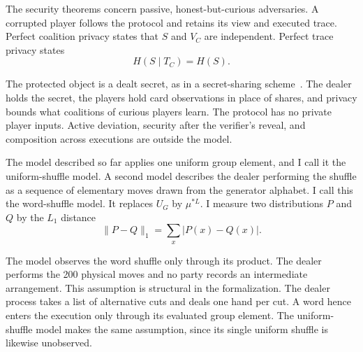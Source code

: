 \documentclass[runningheads]{llncs}
\begin{document}
The security theorems concern passive, honest-but-curious adversaries. A
corrupted player follows the protocol and retains its view and executed
trace. Perfect coalition privacy states that $S$ and $V_C$ are independent.
Perfect trace privacy states
\begin{equation}
  H(S\mid T_C)=H(S).
  \label{eq:trace-privacy}
\end{equation}

The protected object is a dealt secret, as in a secret-sharing
scheme~\cite{Shamir1979}. The dealer holds the secret, the players hold
card observations in place of shares, and privacy bounds what coalitions of
curious players learn. The protocol has no private player inputs. Active
deviation, security after the verifier's reveal, and composition across
executions are outside the model.

The model described so far applies one uniform group element, and I call
it the uniform-shuffle model. A second model describes the dealer
performing the shuffle as a sequence of elementary moves drawn from the
generator alphabet. I call this the
word-shuffle model. It
replaces $U_G$ by $\mu^{*L}$. I measure two distributions $P$
and $Q$ by the $L_1$ distance
\begin{equation}
  \lVert P-Q\rVert_1=\sum_x\lvert P(x)-Q(x)\rvert.
  \label{eq:l1-definition}
\end{equation}

The model observes the word shuffle only through its product. The dealer
performs the 200 physical moves and no party records an intermediate
arrangement. This assumption is structural in the formalization. The dealer process takes a list of alternative cuts and deals one hand
per cut. A word hence enters the execution only through its evaluated
group element. The uniform-shuffle model makes the same assumption, since its single
uniform shuffle is likewise unobserved.
\end{document}

